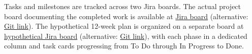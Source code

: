 Tasks and milestones are tracked across two Jira boards. The actual project board documenting the completed work is available at \href{https://uniofbristol-semtm0045-lo25538.atlassian.net/jira/software/projects/UBDSMP/boards/2/timeline}{Jira board} (alternative: \href{https://github.com/UoB-DSMP2026/research-portfolio-lo25538/tree/main/Project%20Planning/Gantt%20Chart}{Git link}). The hypothetical 12-week plan is organized on a separate board at \href{https://uniofbristol-semtm0045-lo25538.atlassian.net/jira/software/projects/PDPDF/boards/35/timeline?timeline=WEEKS}{hypothetical Jira board} (alternative: \href{https://github.com/UoB-DSMP2026/research-portfolio-lo25538/tree/main/Project%20Planning/Hypothetical%20Project%20Plan}{Git link}), with each phase in a dedicated column and task cards progressing from To Do through In Progress to Done.